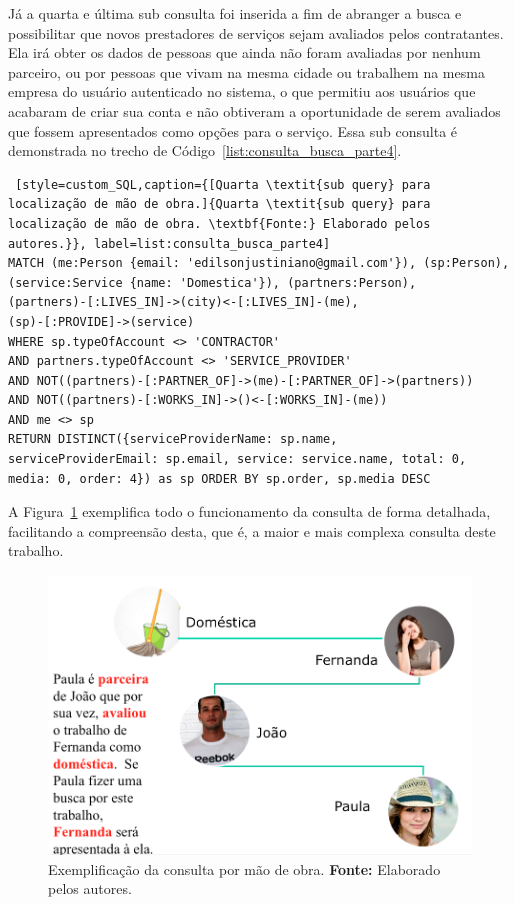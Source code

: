 Já a quarta e última sub consulta foi inserida a fim de abranger a busca e possibilitar que novos prestadores de serviços sejam avaliados pelos contratantes. Ela irá obter os dados de pessoas que ainda não foram avaliadas por nenhum parceiro, ou por pessoas que vivam na mesma cidade ou trabalhem na mesma empresa do usuário autenticado no sistema, o que permitiu aos usuários que acabaram de criar sua conta e não obtiveram a oportunidade de serem avaliados que fossem apresentados como opções para o serviço. Essa sub consulta é demonstrada no trecho de Código~\ref{list:consulta_busca_parte4}.

\begin{lstlisting} [style=custom_SQL,caption={[Quarta \textit{sub query} para localização de mão de obra.]{Quarta \textit{sub query} para localização de mão de obra. \textbf{Fonte:} Elaborado pelos autores.}}, label=list:consulta_busca_parte4] 	
MATCH (me:Person {email: 'edilsonjustiniano@gmail.com'}), (sp:Person),
(service:Service {name: 'Domestica'}), (partners:Person),
(partners)-[:LIVES_IN]->(city)<-[:LIVES_IN]-(me), 
(sp)-[:PROVIDE]->(service)
WHERE sp.typeOfAccount <> 'CONTRACTOR' 
AND partners.typeOfAccount <> 'SERVICE_PROVIDER'
AND NOT((partners)-[:PARTNER_OF]->(me)-[:PARTNER_OF]->(partners))
AND NOT((partners)-[:WORKS_IN]->()<-[:WORKS_IN]-(me))
AND me <> sp
RETURN DISTINCT({serviceProviderName: sp.name, 
serviceProviderEmail: sp.email, service: service.name, total: 0,
media: 0, order: 4}) as sp ORDER BY sp.order, sp.media DESC
\end{lstlisting}

\par A Figura~\ref{fig:explificar_consulta_busca_mao_de_obra} exemplifica todo o funcionamento da consulta de forma detalhada, facilitando a compreensão desta, que é, a maior e mais complexa consulta deste trabalho.

\begin{figure}[h!]
	\centerline{\includegraphics[scale=0.4]{./imagens/exemplo-funcionamento-consulta-buscar-mao-de-obra.png}}
	\caption[Exemplificação da consulta por mão de obra.]
	{Exemplificação da consulta por mão de obra. \textbf{Fonte:} Elaborado pelos autores.}
	\label{fig:explificar_consulta_busca_mao_de_obra}
\end{figure}


